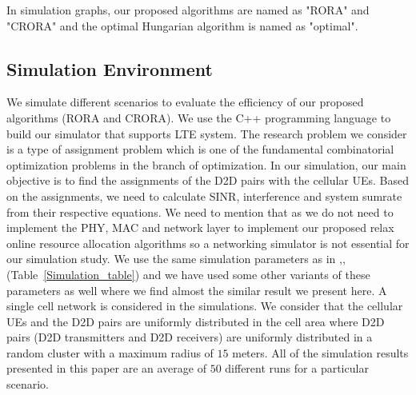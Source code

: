 \documentclass[times]{dacauth}
\begin{document}
\smallskip
\par
\noindent
In simulation graphs, our proposed algorithms are named as "RORA" and "CRORA" and the optimal Hungarian algorithm is named as "optimal".


\subsection{Simulation Environment}

\noindent
We simulate different scenarios to evaluate the efficiency of our proposed algorithms (RORA and CRORA). We use the C++ programming language to build our simulator that supports LTE system. The research problem we consider is a type of assignment problem which is one of the fundamental combinatorial optimization problems in the branch of optimization. In our simulation, our main objective is to find the assignments of the D2D pairs with the cellular UEs. Based on the assignments, we need to calculate SINR, interference and system sumrate from their respective equations. We need to mention that as we do not need to implement the PHY, MAC and network layer to implement our proposed relax online resource allocation algorithms so a networking simulator is not essential for our simulation study. 
\noindent
We use the same simulation parameters as in \cite{lora},\cite{zulhasnine},\cite{dara} (Table~\ref{Simulation_table}) and we have used some other variants of these parameters as well where we find almost the similar result we present here. A single cell network is considered in the simulations. We consider that the cellular UEs and the D2D pairs are uniformly distributed in the cell area where D2D pairs (D2D transmitters and D2D receivers) are uniformly distributed in a random cluster with a maximum radius of $15$ meters. All of the simulation results presented in this paper are an average of $50$ different runs for a particular scenario.  
\end{document}
